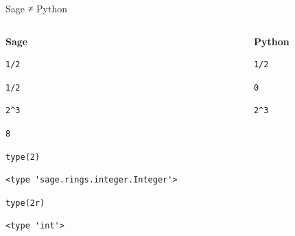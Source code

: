 \documentclass[presentation,smaller]{beamer}
\begin{document}
\begin{frame}[fragile,label={sec:orgb6e8ed0}]{Sage ≠ Python}
 \begin{columns}[t]
\begin{column}{0.45\columnwidth}
\textbf{Sage}

\lstset{language=sage,label= ,caption= ,captionpos=b,numbers=none}
\begin{lstlisting}
1/2
\end{lstlisting}

\begin{verbatim}
1/2
\end{verbatim}

\lstset{language=sage,label= ,caption= ,captionpos=b,numbers=none}
\begin{lstlisting}
2^3
\end{lstlisting}

\begin{verbatim}
8
\end{verbatim}

\lstset{language=sage,label= ,caption= ,captionpos=b,numbers=none}
\begin{lstlisting}
type(2)
\end{lstlisting}

\begin{verbatim}
<type 'sage.rings.integer.Integer'>
\end{verbatim}

\lstset{language=sage,label= ,caption= ,captionpos=b,numbers=none}
\begin{lstlisting}
type(2r)
\end{lstlisting}

\begin{verbatim}
<type 'int'>
\end{verbatim}
\end{column}

\begin{column}{0.45\columnwidth}
\textbf{Python}

\lstset{language=Python,label= ,caption= ,captionpos=b,numbers=none}
\begin{lstlisting}
1/2
\end{lstlisting}

\begin{verbatim}
0
\end{verbatim}

\lstset{language=Python,label= ,caption= ,captionpos=b,numbers=none}
\begin{lstlisting}
2^3
\end{lstlisting}


\end{column}
\end{columns}
\end{frame}
\end{document}
